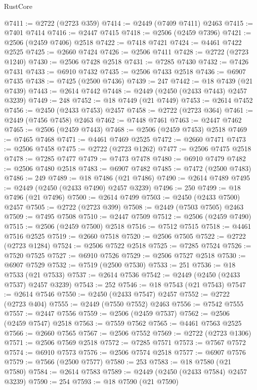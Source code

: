 \begin{lexlean}{RustCore}
\begin{coremodule}
@7411 := @2722 (@2723 @359)
@7414 := @2449 (@7409 @7411) @2463
@7415 := @7401 @7414
@7416 := @2447 @7415
@7418 := @2506 (@2459 @7396)
@7421 := @2506 (@2459 @7406) @2518
@7422 := @7418 @7421
@7424 := @4461 @7422 @2525
@7425 := @2660 @7424
@7426 := @2506 @7411
@7428 := @2722 (@2723 @1240)
@7430 := @2506 @7428 @2518
@7431 := @7285 @7430
@7432 := @7426 @7431
@7433 := @6910 @7432
@7435 := @2506 @7433 @2518
@7436 := @6907 @7435
@7438 := @7425 (@2500 @7436)
@7439 := 247
@7442 := @18 @7439 (@21 @7439)
@7443 := @2614 @7442
@7448 := @2449 (@2450 (@2433 @7443) @2457 @3239)
@7449 := 248
@7452 := @18 @7449 (@21 @7449)
@7453 := @2614 @7452
@7456 := @2450 (@2433 @7453) @2457
@7458 := @2722 (@2723 @364)
@7461 := @2449 (@7456 @7458) @2463
@7462 := @7448 @7461
@7463 := @2447 @7462
@7465 := @2506 (@2459 @7443)
@7468 := @2506 (@2459 @7453) @2518
@7469 := @7465 @7468
@7471 := @4461 @7469 @2525
@7472 := @2660 @7471
@7473 := @2506 @7458
@7475 := @2722 (@2723 @1262)
@7477 := @2506 @7475 @2518
@7478 := @7285 @7477
@7479 := @7473 @7478
@7480 := @6910 @7479
@7482 := @2506 @7480 @2518
@7483 := @6907 @7482
@7485 := @7472 (@2500 @7483)
@7486 := 249
@7489 := @18 @7486 (@21 @7486)
@7490 := @2614 @7489
@7495 := @2449 (@2450 (@2433 @7490) @2457 @3239)
@7496 := 250
@7499 := @18 @7496 (@21 @7496)
@7500 := @2614 @7499
@7503 := @2450 (@2433 @7500) @2457
@7505 := @2722 (@2723 @399)
@7508 := @2449 (@7503 @7505) @2463
@7509 := @7495 @7508
@7510 := @2447 @7509
@7512 := @2506 (@2459 @7490)
@7515 := @2506 (@2459 @7500) @2518
@7516 := @7512 @7515
@7518 := @4461 @7516 @2525
@7519 := @2660 @7518
@7520 := @2506 @7505
@7522 := @2722 (@2723 @1284)
@7524 := @2506 @7522 @2518
@7525 := @7285 @7524
@7526 := @7520 @7525
@7527 := @6910 @7526
@7529 := @2506 @7527 @2518
@7530 := @6907 @7529
@7532 := @7519 (@2500 @7530)
@7533 := 251
@7536 := @18 @7533 (@21 @7533)
@7537 := @2614 @7536
@7542 := @2449 (@2450 (@2433 @7537) @2457 @3239)
@7543 := 252
@7546 := @18 @7543 (@21 @7543)
@7547 := @2614 @7546
@7550 := @2450 (@2433 @7547) @2457
@7552 := @2722 (@2723 @404)
@7555 := @2449 (@7550 @7552) @2463
@7556 := @7542 @7555
@7557 := @2447 @7556
@7559 := @2506 (@2459 @7537)
@7562 := @2506 (@2459 @7547) @2518
@7563 := @7559 @7562
@7565 := @4461 @7563 @2525
@7566 := @2660 @7565
@7567 := @2506 @7552
@7569 := @2722 (@2723 @1306)
@7571 := @2506 @7569 @2518
@7572 := @7285 @7571
@7573 := @7567 @7572
@7574 := @6910 @7573
@7576 := @2506 @7574 @2518
@7577 := @6907 @7576
@7579 := @7566 (@2500 @7577)
@7580 := 253
@7583 := @18 @7580 (@21 @7580)
@7584 := @2614 @7583
@7589 := @2449 (@2450 (@2433 @7584) @2457 @3239)
@7590 := 254
@7593 := @18 @7590 (@21 @7590)

\end{coremodule}
\end{lexlean}
